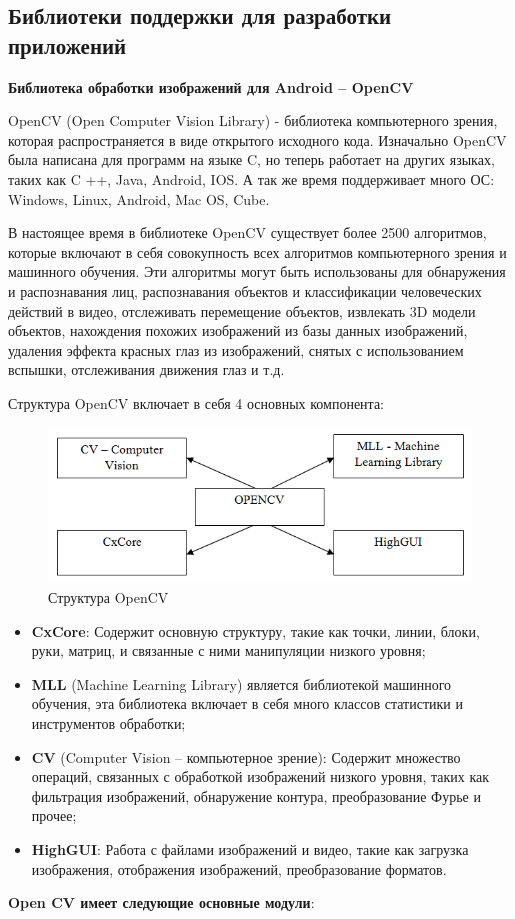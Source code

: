 \subsection{Библиотеки поддержки для разработки приложений}
\textbf{Библиотека обработки изображений для Android – OpenCV}

OpenCV (Open Computer Vision Library) - библиотека компьютерного зрения, которая распространяется в виде открытого исходного кода. Изначально OpenCV была написана для программ на языке C, но теперь работает на других языках, таких как C ++, Java, Android, IOS. А так же время поддерживает много ОС: Windows, Linux, Android, Mac OS, Cube.

В настоящее время в библиотеке OpenCV существует более 2500 алгоритмов, которые включают в себя совокупность всех алгоритмов компьютерного зрения и машинного обучения. Эти алгоритмы могут быть использованы для обнаружения и распознавания лиц, распознавания объектов и классификации человеческих действий в видео, отслеживать перемещение объектов, извлекать 3D модели объектов, нахождения похожих изображений из базы данных изображений, удаления эффекта красных глаз из изображений, снятых с использованием вспышки, отслеживания движения глаз и т.д.

Структура OpenCV включает в себя 4 основных компонента:
\begin{figure}[ht!]
\centering
\includegraphics [scale=1] {images/h31.png}
\begin{center}
\caption{Структура OpenCV} \label{img31}
\end{center}
\end{figure}


\begin{itemize}
	\item \textbf{CxCore}: Содержит основную структуру, такие как точки, линии, блоки, руки, матриц, и связанные с ними манипуляции низкого уровня;
	\item \textbf{MLL} (Machine Learning Library) является библиотекой машинного обучения, эта библиотека включает в себя много классов статистики и инструментов обработки;
	\item \textbf{CV} (Computer Vision – компьютерное зрение): Содержит множество операций, связанных с обработкой изображений низкого уровня, таких как фильтрация изображений, обнаружение контура, преобразование Фурье и прочее;
	\item \textbf{HighGUI}: Работа с файлами изображений и видео, такие как загрузка изображения, отображения изображений, преобразование форматов.
\end{itemize}
\textbf{Open CV имеет следующие основные модули}:


